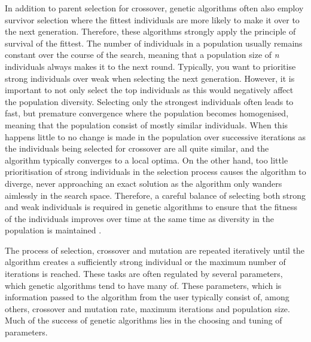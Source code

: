 In addition to parent selection for crossover, genetic algorithms often also employ survivor selection where the fittest individuals are more likely to make it over to the next generation. Therefore, these algorithms strongly apply the principle of survival of the fittest. The number of individuals in a population usually remains constant over the course of the search, meaning that a population size of \textit{n} individuals always makes it to the next round. Typically, you want to prioritise strong individuals over weak when selecting the next generation. However, it is important to not only select the top individuals as this would negatively affect the population diversity. Selecting only the strongest individuals often leads to fast, but premature convergence where the population becomes homogenised, meaning that the population consist of mostly similar individuals. When this happens little to no change is made in the population over successive iterations as the individuals being selected for crossover are all quite similar, and the algorithm typically converges to a local optima. On the other hand, too little prioritisation of strong individuals in the selection process causes the algorithm to diverge, never approaching an exact solution as the algorithm only wanders aimlessly in the search space. Therefore, a careful balance of selecting both strong and weak individuals is required in genetic algorithms to ensure that the fitness of the individuals improves over time at the same time as diversity in the population is maintained \cite{floreano2008bio}.

The process of selection, crossover and mutation are repeated iteratively until the algorithm creates a sufficiently strong individual or the maximum number of iterations is reached. These tasks are often regulated by several parameters, which genetic algorithms tend to have many of. These parameters, which is information passed to the algorithm from the user typically consist of, among others, crossover and mutation rate, maximum iterations and population size. Much of the success of genetic algorithms lies in the choosing and tuning of parameters. 



